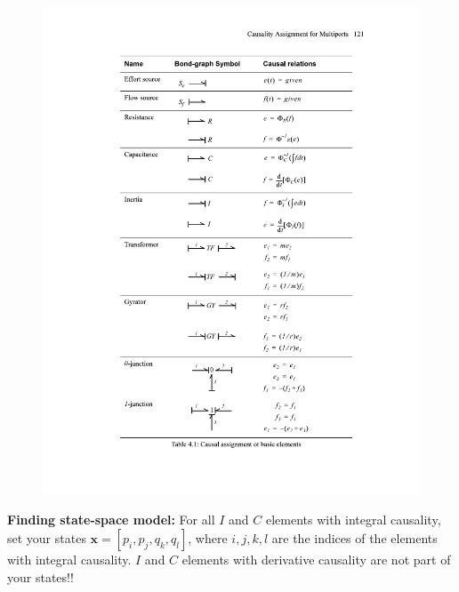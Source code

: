 \begin{figure}[H]
\begin{minipage}{.5\textwidth}
        \includegraphics[width=.9\linewidth]{figures/Tabell_CausalRelations.pdf}
        \label{fig:bond_graph3}
    \end{minipage}
\end{figure}
\textbf{Finding state-space model: }\newline
For all $I$ and $C$ elements with integral causality, set your states $\mathbf{x} = [p_i, p_j, q_k, q_l]$, where $i,j,k,l$ are the indices of the elements with integral causality. $I$ and $C$ elements with derivative causality are not part of your states!!
